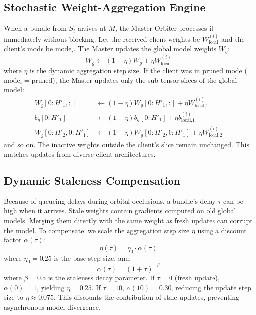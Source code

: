 \documentclass[journal,twocolumn]{IEEEtran}
\begin{document}
\subsection{Stochastic Weight-Aggregation Engine}
When a bundle from $S_i$ arrives at $M$, the Master Orbiter processes it immediately without blocking. Let the received client weights be $W^{(i)}_{\text{local}}$ and the client's mode be $\text{mode}_i$. The Master updates the global model weights $W_g$:
\begin{equation}
    W_g \leftarrow (1 - \eta) W_g + \eta W^{(i)}_{\text{local}}
\end{equation}
where $\eta$ is the dynamic aggregation step size.
If the client was in pruned mode ($\text{mode}_i = \text{pruned}$), the Master updates only the sub-tensor slices of the global model:
\begin{align}
    W_g[0:H'_1, :] &\leftarrow (1 - \eta) W_g[0:H'_1, :] + \eta W^{(i)}_{\text{local,1}} \\
    b_g[0:H'_1] &\leftarrow (1 - \eta) b_g[0:H'_1] + \eta b^{(i)}_{\text{local,1}} \\
    W_g[0:H'_2, 0:H'_1] &\leftarrow (1 - \eta) W_g[0:H'_2, 0:H'_1] + \eta W^{(i)}_{\text{local,2}}
\end{align}
and so on. The inactive weights outside the client's slice remain unchanged. This matches updates from diverse client architectures.

\subsection{Dynamic Staleness Compensation}
Because of queueing delays during orbital occlusions, a bundle's delay $\tau$ can be high when it arrives. Stale weights contain gradients computed on old global models. Merging them directly with the same weight as fresh updates can corrupt the model. To compensate, we scale the aggregation step size $\eta$ using a discount factor $\alpha(\tau)$:
\begin{equation}
    \eta(\tau) = \eta_0 \cdot \alpha(\tau)
\end{equation}
where $\eta_0 = 0.25$ is the base step size, and:
\begin{equation}
    \alpha(\tau) = (1 + \tau)^{-\beta}
\end{equation}
where $\beta = 0.5$ is the staleness decay parameter. If $\tau = 0$ (fresh update), $\alpha(0) = 1$, yielding $\eta = 0.25$. If $\tau = 10$, $\alpha(10) = 0.30$, reducing the update step size to $\eta \approx 0.075$. This discounts the contribution of stale updates, preventing asynchronous model divergence.
\end{document}
